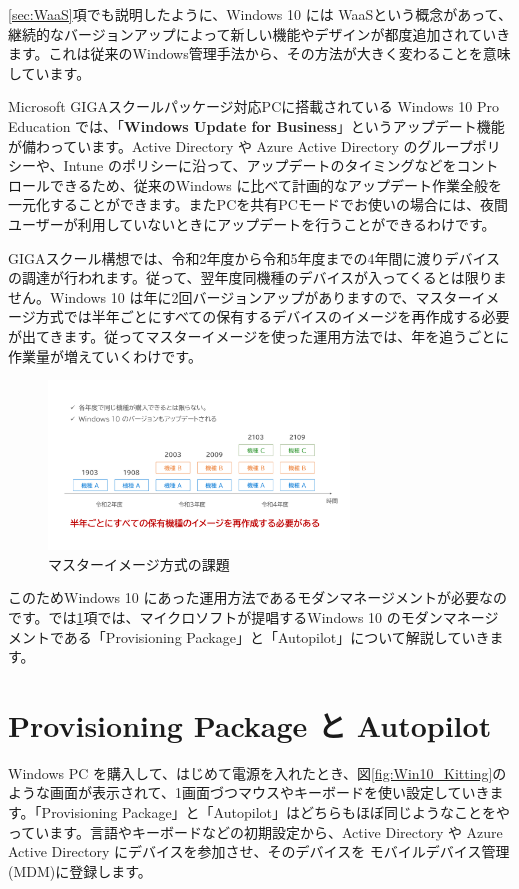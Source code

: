 \ref{sec:WaaS}項でも説明したように、Windows 10 には WaaSという概念があって、継続的なバージョンアップによって新しい機能やデザインが都度追加されていきます。これは従来のWindows管理手法から、その方法が大きく変わることを意味しています。

Microsoft GIGAスクールパッケージ対応PCに搭載されている Windows 10 Pro Education では、「\textbf{Windows Update for Business}」というアップデート機能が備わっています。Active Directory や Azure Active Directory のグループポリシーや、Intune のポリシーに沿って、アップデートのタイミングなどをコントロールできるため、従来のWindows に比べて計画的なアップデート作業全般を一元化することができます。またPCを共有PCモードでお使いの場合には、夜間ユーザーが利用していないときにアップデートを行うことができるわけです。

GIGAスクール構想では、令和2年度から令和5年度までの4年間に渡りデバイスの調達が行われます。従って、翌年度同機種のデバイスが入ってくるとは限りません。Windows 10 は年に2回バージョンアップがありますので、マスターイメージ方式では半年ごとにすべての保有するデバイスのイメージを再作成する必要が出てきます。従ってマスターイメージを使った運用方法では、年を追うごとに作業量が増えていくわけです。

\begin{figure}[htbp]
    \centering
    \includegraphics[width=8cm]{figures/MasterImage2.png}
    \caption{マスターイメージ方式の課題}
    \label{fig:MasterImage2}
\end{figure}

このためWindows 10 にあった運用方法であるモダンマネージメントが必要なのです。では\ref{sec:ProvisioningPackage}項では、マイクロソフトが提唱するWindows 10 のモダンマネージメントである「Provisioning Package」と「Autopilot」について解説していきます。


\section{Provisioning Package と Autopilot}
\label{sec:ProvisioningPackage}

Windows PC を購入して、はじめて電源を入れたとき、図\ref{fig:Win10_Kitting}のような画面が表示されて、1画面づつマウスやキーボードを使い設定していきます。「Provisioning Package」と「Autopilot」はどちらもほぼ同じようなことをやっています。言語やキーボードなどの初期設定から、Active Directory や Azure Active Directory にデバイスを参加させ、そのデバイスを モバイルデバイス管理(MDM)に登録します。

